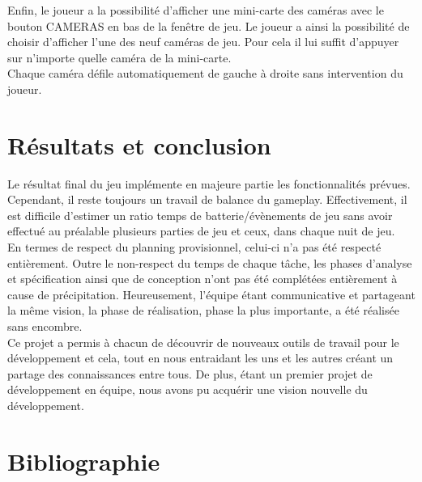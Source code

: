 \documentclass[11pt, a4paper]{article}
\begin{document}
Enfin, le joueur a la possibilité d'afficher une mini-carte des caméras avec le bouton CAMERAS en bas de la fenêtre de jeu. Le joueur a ainsi la possibilité de choisir d'afficher l'une des neuf caméras de jeu. Pour cela il lui suffit d'appuyer sur n'importe quelle caméra de la mini-carte.\\

Chaque caméra défile automatiquement de gauche à droite sans intervention du joueur.

\section{Résultats et conclusion}

Le résultat final du jeu implémente en majeure partie les fonctionnalités prévues. Cependant, il reste toujours un travail de balance du gameplay. Effectivement, il est difficile d'estimer un ratio temps de batterie/évènements de jeu sans avoir effectué au préalable plusieurs parties de jeu et ceux, dans chaque nuit de jeu.\\

En termes de respect du planning provisionnel, celui-ci n'a pas été respecté entièrement. Outre le non-respect du temps de chaque tâche, les phases d'analyse et spécification ainsi que de conception n'ont pas été complétées entièrement à cause de précipitation. Heureusement, l'équipe étant communicative et partageant la même vision, la phase de réalisation, phase la plus importante, a été réalisée sans encombre.\\

Ce projet a permis à chacun de découvrir de nouveaux outils de travail pour le développement et cela, tout en nous entraidant les uns et les autres créant un partage des connaissances entre tous. De plus, étant un premier projet de développement en équipe, nous avons pu acquérir une vision nouvelle du développement.

\newpage

\section{Bibliographie}
\end{document}
